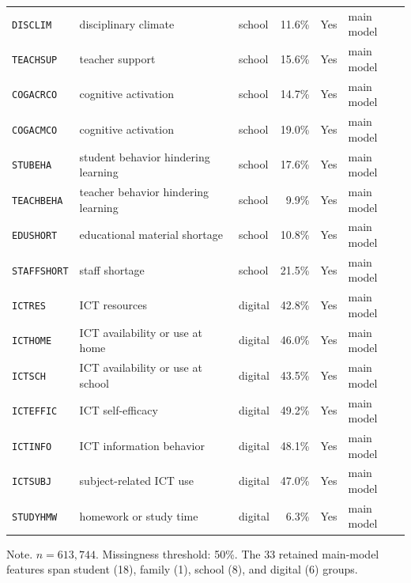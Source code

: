 \begin{table}[htp]
{\begin{tabular}{@{}lllrcl@{}}
  \texttt{DISCLIM} & disciplinary climate & school & 11.6\% & Yes & main model \\
  \texttt{TEACHSUP} & teacher support & school & 15.6\% & Yes & main model \\
  \texttt{COGACRCO} & cognitive activation & school & 14.7\% & Yes & main model \\
  \texttt{COGACMCO} & cognitive activation & school & 19.0\% & Yes & main model \\
  \texttt{STUBEHA} & student behavior hindering learning & school & 17.6\% & Yes & main model \\
  \texttt{TEACHBEHA} & teacher behavior hindering learning & school & 9.9\% & Yes & main model \\
  \texttt{EDUSHORT} & educational material shortage & school & 10.8\% & Yes & main model \\
  \texttt{STAFFSHORT} & staff shortage & school & 21.5\% & Yes & main model \\
  \texttt{ICTRES} & ICT resources & digital & 42.8\% & Yes & main model \\
  \texttt{ICTHOME} & ICT availability or use at home & digital & 46.0\% & Yes & main model \\
  \texttt{ICTSCH} & ICT availability or use at school & digital & 43.5\% & Yes & main model \\
  \texttt{ICTEFFIC} & ICT self-efficacy & digital & 49.2\% & Yes & main model \\
  \texttt{ICTINFO} & ICT information behavior & digital & 48.1\% & Yes & main model \\
  \texttt{ICTSUBJ} & subject-related ICT use & digital & 47.0\% & Yes & main model \\
  \texttt{STUDYHMW} & homework or study time & digital & 6.3\% & Yes & main model \\
\bottomrule
\end{tabular}%
}
\begin{tablenotes}
\item Note. $n = 613{,}744$. Missingness threshold: 50\%. The 33 retained main-model features span student (18), family (1), school (8), and digital (6) groups.
\end{tablenotes}
\end{table}
